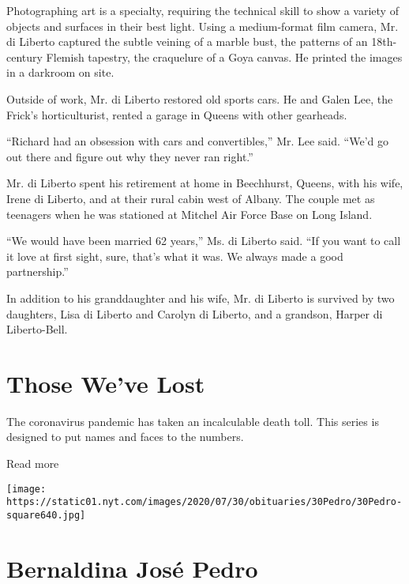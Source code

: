 Photographing art is a specialty, requiring the technical skill to show
a variety of objects and surfaces in their best light. Using a
medium-format film camera, Mr. di Liberto captured the subtle veining of
a marble bust, the patterns of an 18th-century Flemish tapestry, the
craquelure of a Goya canvas. He printed the images in a darkroom on
site.

Outside of work, Mr. di Liberto restored old sports cars. He and Galen
Lee, the Frick's horticulturist, rented a garage in Queens with other
gearheads.

``Richard had an obsession with cars and convertibles,'' Mr. Lee said.
``We'd go out there and figure out why they never ran right.''

Mr. di Liberto spent his retirement at home in Beechhurst, Queens, with
his wife, Irene di Liberto, and at their rural cabin west of Albany. The
couple met as teenagers when he was stationed at Mitchel Air Force Base
on Long Island.

``We would have been married 62 years,'' Ms. di Liberto said. ``If you
want to call it love at first sight, sure, that's what it was. We always
made a good partnership.''

In addition to his granddaughter and his wife, Mr. di Liberto is
survived by two daughters, Lisa di Liberto and Carolyn di Liberto, and a
grandson, Harper di Liberto-Bell.

\href{https://www.nytimes.com/interactive/2020/obituaries/people-died-coronavirus-obituaries.html?action=click\&pgtype=Article\&state=default\&region=BELOW_MAIN_CONTENT\&context=covid_obits_promo}{}

\hypertarget{those-weve-lost}{%
\section{Those We've Lost}\label{those-weve-lost}}

The coronavirus pandemic has taken an incalculable death toll. This
series is designed to put names and faces to the numbers.

Read more

\texttt{[image: https://static01.nyt.com/images/2020/07/30/obituaries/30Pedro/30Pedro-square640.jpg]}

\hypertarget{bernaldina-josuxe9-pedro}{%
\section{Bernaldina José Pedro}\label{bernaldina-josuxe9-pedro}}

